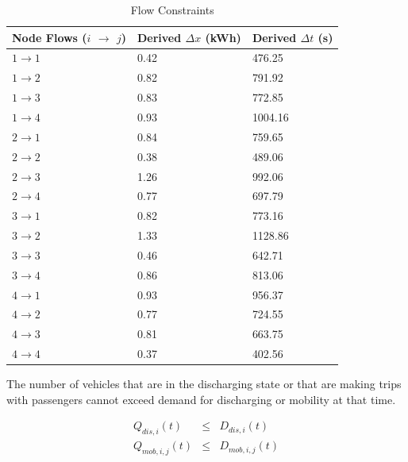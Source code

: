 \documentclass[journal]{IEEEtran}
\begin{document}
\begin{table}[!htbp]
    \renewcommand{\arraystretch}{1}
    \caption{Flow Constraints}
    \label{tab:flow constraints}
    \centering
    \def\colmargin{6.75cm}
    \begin{tabular}{lll}
    \hline
    \textbf{Node Flows ($i$ $\rightarrow$ $j$)} & \textbf{Derived} $\Delta x$ (kWh) & \textbf{Derived} $\Delta t$ (s) \\
    \hline
    $1\rightarrow1$ & 0.42  & 476.25  \\
    $1\rightarrow2$ & 0.82  & 791.92  \\
    $1\rightarrow3$ & 0.83  & 772.85  \\
    $1\rightarrow4$ & 0.93  & 1004.16  \\
    $2\rightarrow1$ & 0.84  & 759.65  \\
    $2\rightarrow2$ & 0.38  & 489.06  \\
    $2\rightarrow3$ & 1.26  & 992.06  \\
    $2\rightarrow4$ & 0.77  & 697.79  \\
    $3\rightarrow1$ & 0.82  & 773.16  \\
    $3\rightarrow2$ & 1.33  & 1128.86  \\
    $3\rightarrow3$ & 0.46  & 642.71  \\
    $3\rightarrow4$ & 0.86  & 813.06  \\
    $4\rightarrow1$ & 0.93  & 956.37  \\
    $4\rightarrow2$ & 0.77  & 724.55  \\
    $4\rightarrow3$ & 0.81  & 663.75  \\
    $4\rightarrow4$ & 0.37  & 402.56  \\
    \hline
    \end{tabular}
\end{table}

The number of vehicles that are in the discharging state or that are making trips with passengers cannot exceed demand for discharging or mobility at that time.

\begin{eqnarray*}
   Q_{dis,i}(t) & \le & D_{dis,i}(t) \\
   Q_{mob,i,j}(t) & \le & D_{mob,i,j}(t) \\
\end{eqnarray*}
\end{document}
